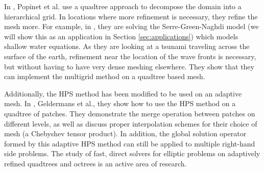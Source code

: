 In \citep{popinet2015quadtree}, Popinet et al. use a quadtree approach to decompose the domain into a hierarchical grid. In locations where more refinement is necessary, they refine the mesh more. For example, in \citep{popinet2015quadtree}, they are solving the Serre-Green-Naghdi model (we will show this as an application in Section \ref{sec:applications}) which models shallow water equations. As they are looking at a tsunami traveling across the surface of the earth, refinement near the location of the wave fronts is necessary, but without having to have very dense meshing elsewhere. They show that they can implement the multigrid method on a quadtree based mesh.

Additionally, the HPS method has been modified to be used on an adaptive mesh. In \citep{geldermans2019adaptive}, Geldermans et al., they show how to use the HPS method on a quadtree of patches. They demonstrate the merge operation between patches on different levels, as well as discuss proper interpolation schemes for their choice of mesh (a Chebyshev tensor product). In addition, the global solution operator formed by this adaptive HPS method can still be applied to multiple right-hand side problems. The study of fast, direct solvers for elliptic problems on adaptively refined quadtrees and octrees is an active area of research.
